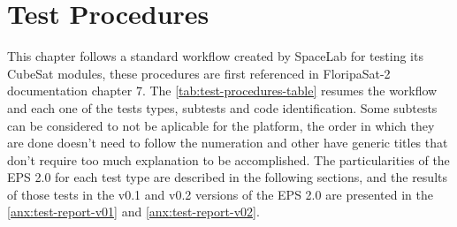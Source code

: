 %
%
%
%
%

%
%
%
%
%
%

\chapter{Test Procedures} \label{ch:test-procedures}

This chapter follows a standard workflow created by SpaceLab for testing its CubeSat modules, these procedures are first referenced in FloripaSat-2 documentation chapter 7\cite{floripasat2-doc}. The \autoref{tab:test-procedures-table} resumes the workflow and each one of the tests types, subtests and code identification. Some subtests can be considered to not be aplicable for the platform, the order in which they are done doesn't need to follow the numeration and other have generic titles that don't require too much explanation to be accomplished. The particularities of the EPS 2.0 for each test type are described in the following sections, and the results of those tests in the v0.1 and v0.2 versions of the EPS 2.0 are presented in the \autoref{anx:test-report-v01} and \autoref{anx:test-report-v02}.

